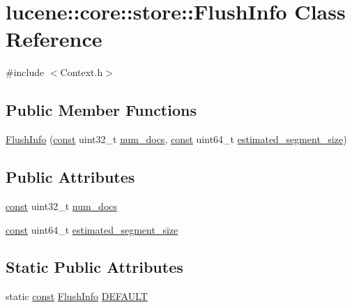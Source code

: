 \hypertarget{classlucene_1_1core_1_1store_1_1FlushInfo}{}\section{lucene\+:\+:core\+:\+:store\+:\+:Flush\+Info Class Reference}
\label{classlucene_1_1core_1_1store_1_1FlushInfo}


{\ttfamily \#include $<$Context.\+h$>$}

\subsection*{Public Member Functions}
\begin{DoxyCompactItemize}
\item 
\mbox{\hyperlink{classlucene_1_1core_1_1store_1_1FlushInfo_a15bce5aacea0842397f57a9c80a431bb}{Flush\+Info}} (\mbox{\hyperlink{ZlibCrc32_8h_a2c212835823e3c54a8ab6d95c652660e}{const}} uint32\+\_\+t \mbox{\hyperlink{classlucene_1_1core_1_1store_1_1FlushInfo_afd1e74825aae487ea14ffa44339477df}{num\+\_\+docs}}, \mbox{\hyperlink{ZlibCrc32_8h_a2c212835823e3c54a8ab6d95c652660e}{const}} uint64\+\_\+t \mbox{\hyperlink{classlucene_1_1core_1_1store_1_1FlushInfo_a9aeb58ad8b9ff136d9a6930d8149bba2}{estimated\+\_\+segment\+\_\+size}})
\end{DoxyCompactItemize}
\subsection*{Public Attributes}
\begin{DoxyCompactItemize}
\item 
\mbox{\hyperlink{ZlibCrc32_8h_a2c212835823e3c54a8ab6d95c652660e}{const}} uint32\+\_\+t \mbox{\hyperlink{classlucene_1_1core_1_1store_1_1FlushInfo_afd1e74825aae487ea14ffa44339477df}{num\+\_\+docs}}
\item 
\mbox{\hyperlink{ZlibCrc32_8h_a2c212835823e3c54a8ab6d95c652660e}{const}} uint64\+\_\+t \mbox{\hyperlink{classlucene_1_1core_1_1store_1_1FlushInfo_a9aeb58ad8b9ff136d9a6930d8149bba2}{estimated\+\_\+segment\+\_\+size}}
\end{DoxyCompactItemize}
\subsection*{Static Public Attributes}
\begin{DoxyCompactItemize}
\item 
static \mbox{\hyperlink{ZlibCrc32_8h_a2c212835823e3c54a8ab6d95c652660e}{const}} \mbox{\hyperlink{classlucene_1_1core_1_1store_1_1FlushInfo}{Flush\+Info}} \mbox{\hyperlink{classlucene_1_1core_1_1store_1_1FlushInfo_ae3bd10904cadef389ecb82cf54dc1c7f}{D\+E\+F\+A\+U\+LT}}
\end{DoxyCompactItemize}


